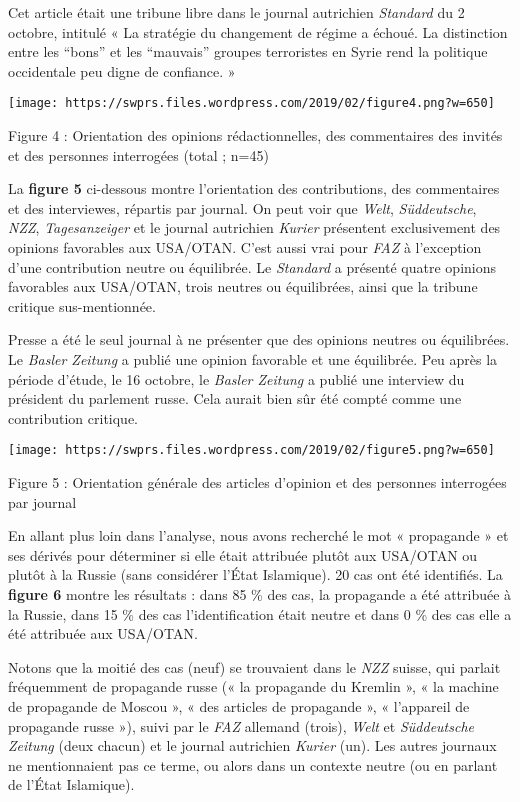 Cet article était une tribune libre dans le journal autrichien
\emph{Standard} du 2 octobre, intitulé « La stratégie du changement de
régime a échoué. La distinction entre les ``bons'' et les ``mauvais''
groupes terroristes en Syrie rend la politique occidentale peu digne de
confiance. »

\texttt{[image: https://swprs.files.wordpress.com/2019/02/figure4.png?w=650]}

Figure 4 : Orientation des opinions rédactionnelles, des commentaires
des invités et des personnes interrogées (total ; n=45)

La \textbf{figure 5} ci-dessous montre l'orientation des contributions,
des commentaires et des interviewes, répartis par journal. On peut voir
que \emph{Welt}, \emph{Süddeutsche}, \emph{NZZ}, \emph{Tagesanzeiger} et
le journal autrichien \emph{Kurier} présentent exclusivement des
opinions favorables aux USA/OTAN. C'est aussi vrai pour \emph{FAZ} à
l'exception d'une contribution neutre ou équilibrée. Le \emph{Standard}
a présenté quatre opinions favorables aux USA/OTAN, trois neutres ou
équilibrées, ainsi que la tribune critique sus-mentionnée.

Presse a été le seul journal à ne présenter que des opinions neutres ou
équilibrées. Le \emph{Basler Zeitung} a publié une opinion favorable et
une équilibrée. Peu après la période d'étude, le 16 octobre, le
\emph{Basler Zeitung} a publié une interview du président du parlement
russe. Cela aurait bien sûr été compté comme une contribution critique.

\texttt{[image: https://swprs.files.wordpress.com/2019/02/figure5.png?w=650]}

Figure 5 : Orientation générale des articles d'opinion et des personnes
interrogées par journal

En allant plus loin dans l'analyse, nous avons recherché le mot «
propagande » et ses dérivés pour déterminer si elle était attribuée
plutôt aux USA/OTAN ou plutôt à la Russie (sans considérer l'État
Islamique). 20 cas ont été identifiés. La \textbf{figure 6} montre les
résultats : dans 85 \% des cas, la propagande a été attribuée à la
Russie, dans 15 \% des cas l'identification était neutre et dans 0 \%
des cas elle a été attribuée aux USA/OTAN.

Notons que la moitié des cas (neuf) se trouvaient dans le \emph{NZZ}
suisse, qui parlait fréquemment de propagande russe (« la propagande du
Kremlin », « la machine de propagande de Moscou », « des articles de
propagande », « l'appareil de propagande russe »), suivi par le
\emph{FAZ} allemand (trois), \emph{Welt} et \emph{Süddeutsche Zeitung}
(deux chacun) et le journal autrichien \emph{Kurier} (un). Les autres
journaux ne mentionnaient pas ce terme, ou alors dans un contexte neutre
(ou en parlant de l'État Islamique).

